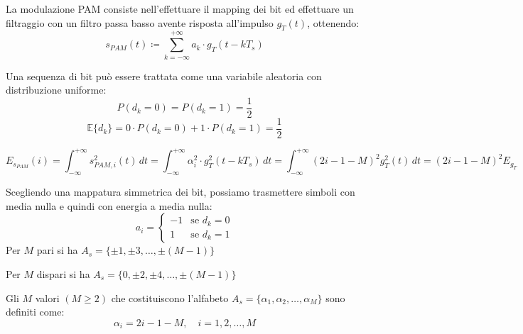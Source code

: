 La modulazione PAM consiste nell'effettuare il mapping dei bit ed effettuare un filtraggio con un filtro passa basso avente risposta all'impulso \( g_T(t) \), ottenendo:
\[ s_{PAM}(t) \coloneqq \sum_{k=-\infty}^{+\infty} a_k\cdot g_T(t - kT_s) \]

Una sequenza di bit può essere trattata come una variabile aleatoria con distribuzione uniforme:
\[
    P(d_k = 0) = P(d_k = 1) = \frac{1}{2} 
\]
\[
    \mathbb{E}\{d_k\} = 0\cdot P(d_k = 0) + 1\cdot P(d_k = 1) = \frac{1}{2}
\]


% 
\[
    E_{s_{PAM}}(i) = \int_{-\infty}^{+\infty} s_{PAM, i}^2(t) \, dt =  \int_{-\infty}^{+\infty} \alpha_i^2 \cdot g_T^2(t - kT_s) \, dt = \int_{-\infty}^{+\infty} (2i - 1 - M)^2 g_T^2(t) \, dt = (2i - 1 - M)^2 E_{g_T}
\]

Scegliendo una mappatura simmetrica dei bit, possiamo trasmettere simboli con media nulla e quindi con energia a media nulla:
\[
    a_i = 
    \begin{cases}
        -1 & \text{se } d_k = 0 \\
        1 & \text{se } d_k = 1
    \end{cases}
\]
Per \( M \) pari si ha \( A_s = \{ \pm 1, \pm 3, \ldots, \pm (M-1) \} \)

Per \( M \) dispari si ha \( A_s = \{ 0, \pm 2, \pm 4, \ldots, \pm (M-1) \} \)


Gli \( M \) valori \( (M \geq 2) \) che costituiscono l'alfabeto \( A_s = \{ \alpha_1, \alpha_2, \ldots, \alpha_M \} \) sono definiti come:
\[ \alpha_i = 2i - 1 - M, \quad i = 1, 2, \ldots, M \]




